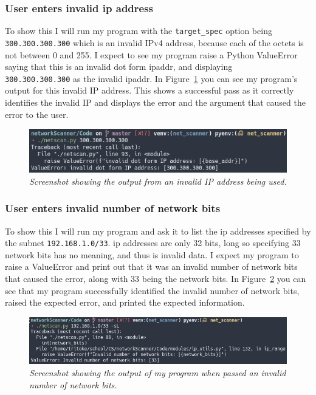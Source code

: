 \documentclass[titlepage]{article}
\let\Oldsubsubsection\subsubsection{}
\renewcommand{\subsubsection}{\FloatBarrier\Oldsubsubsection}
\begin{document}
\subsubsection{User enters invalid ip address}\label{test:invalidip}
To show this I will run my program with the \verb|target_spec|
option being \\
\verb|300.300.300.300| which is an invalid
IPv4 address, because each of the octets is not between 0 and 255.
I expect to see my program raise a Python ValueError
saying that this is an invalid dot form \gls{ipaddr},
and displaying \\
\verb|300.300.300.300| as the invalid \gls{ipaddr}.
In Figure~\ref{invalidip} you can see my program's output
for this invalid IP address. This shows a successful pass as it
correctly identifies the invalid IP and displays the error
and the argument that caused the error to the user.

\begin{figure}[H]
  \centering
  \includegraphics[width=\textwidth]{invalidip.png}
  \caption{\textit{%
    Screenshot showing the output from an invalid IP address being used.
}}\label{invalidip}
\end{figure}

\subsubsection{User enters invalid number of network bits}\label{test:invalidnetworkbits}
To show this I will run my program and ask it to list the
\gls{ip} addresses specified by the subnet \verb|192.168.1.0/33|.
\gls{ip} addresses are only 32 bits, long so specifying 33
network bits has no meaning, and thus is invalid data.
I expect my program to raise a ValueError and print out
that it was an invalid number of network bits that caused
the error, along with 33 being the network bits.
In Figure~\ref{invalidnetworkbits} you can see that
my program successfully identified the invalid number of network bits,
raised the expected error, and printed the expected information.

\begin{figure}[H]
\centering
\includegraphics[width=\textwidth]{invalidnetworkbits.png}
\caption{\textit{%
  Screenshot showing the output of my program when passed
  an invalid number of network bits.
}}\label{invalidnetworkbits}
\end{figure}
\end{document}
